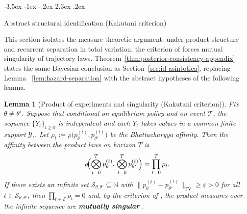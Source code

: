 \documentclass[12pt]{article}
\makeatletter
\numberwithin{equation}{section}
\numberwithin{table}{section}
\newtheorem{lemma}[theorem]{Lemma}
\theoremstyle{definition}
\renewcommand\section{\@startsection {section}{1}{\z@}%
                                   {-3.5ex \@plus -1ex \@minus -.2ex}%
                                   {2.3ex \@plus.2ex}%
                                   {\normalfont\Large\bfseries\raggedright}}
\makeatother
\begin{document}
\section{Abstract structural identification (Kakutani criterion)}
\label{sec:id-abstracta}

\noindent This section isolates the measure-theoretic argument: under product
structure and recurrent separation in total variation, the criterion of
\citet{Kakutani1948} forces mutual singularity of trajectory laws.
Theorem~\ref{thm:posterior-consistency-appendix} states the same Bayesian
conclusion as Section~\ref{sec:id-asintotica}, replacing Lemma
~\ref{lem:hazard-separation} with the abstract hypotheses of the following
lemma.


\begin{lemma}[Product of experiments and singularity (Kakutani criterion)]
\label{lem:general-id-appendix}
Fix $\theta\neq\theta'$. Suppose that conditional on equilibrium policy and
on event $\mathcal{T}$, the sequence $\{Y_t\}_{t\ge 0}$ is independent and each
$Y_t$ takes values in a common finite support $\mathcal{Y}_t$. Let
$\rho_t:=\rho\bigl(p_\theta^{(t)},p_{\theta'}^{(t)}\bigr)$ be the
Bhattacharyya affinity. Then the affinity between the product laws on horizon
$T$ is
\begin{equation}
\label{eq:appendix-rho-product}
\rho\!\Bigl(\bigotimes_{t=0}^{T}p_\theta^{(t)},\,
            \bigotimes_{t=0}^{T}p_{\theta'}^{(t)}\Bigr)
=\prod_{t=0}^{T}\rho_t.
\end{equation}
If there exists an infinite set $\mathcal{S}_{\theta,\theta'}\subseteq\mathbb{N}$
with $\|p_\theta^{(t)}-p_{\theta'}^{(t)}\|_{\mathrm{TV}}\ge\underline\varepsilon>0$
for all $t\in\mathcal{S}_{\theta,\theta'}$, then
$\prod_{t\in\mathcal{S}}\rho_t=0$ and, by the criterion of
\citet{Kakutani1948}, the product measures over the infinite sequence are
\textbf{mutually singular} \citep{Shiryaev2019Probability}.
\end{lemma}
\end{document}
